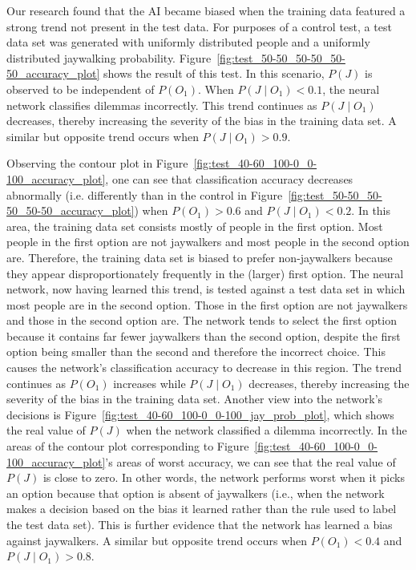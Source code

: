 \documentclass{report}
\begin{document}
Our research found that the AI became biased when the training data featured a strong trend not
present in the test data. For purposes of a control test, a test data set was generated with
uniformly distributed people and a uniformly distributed jaywalking probability.
Figure~\ref{fig:test_50-50_50-50_50-50_accuracy_plot} shows the result of this test. In this
scenario, $P(J)$ is observed to be independent of $P(O_1)$. When $P(J \mid O_1) < 0.1$, the neural
network classifies dilemmas incorrectly. This trend continues as $P(J \mid O_1)$ decreases, thereby
increasing the severity of the bias in the training data set. A similar but opposite trend occurs
when $P(J \mid O_1) > 0.9$.

Observing the contour plot in Figure~\ref{fig:test_40-60_100-0_0-100_accuracy_plot}, one can see
that classification accuracy decreases abnormally (i.e. differently than in the control in
Figure~\ref{fig:test_50-50_50-50_50-50_accuracy_plot}) when $P(O_1) > 0.6$ and $P(J \mid O_1) <
0.2$. In this area, the training data set consists mostly of people in the first option. Most people
in the first option are not jaywalkers and most people in the second option are. Therefore, the
training data set is biased to prefer non-jaywalkers because they appear disproportionately
frequently in the (larger) first option. The neural network, now having learned this trend, is
tested against a test data set in which most people are in the second option. Those in the first
option are not jaywalkers and those in the second option are. The network tends to select the first
option because it contains far fewer jaywalkers than the second option, despite the first option
being smaller than the second and therefore the incorrect choice. This causes the network's
classification accuracy to decrease in this region. The trend continues as $P(O_1)$ increases while
$P(J \mid O_1)$ decreases, thereby increasing the severity of the bias in the training data set.
Another view into the network's decisions is Figure~\ref{fig:test_40-60_100-0_0-100_jay_prob_plot},
which shows the real value of $P(J)$ when the network classified a dilemma incorrectly. In the areas
of the contour plot corresponding to Figure~\ref{fig:test_40-60_100-0_0-100_accuracy_plot}'s areas
of worst accuracy, we can see that the real value of $P(J)$ is close to zero. In other words, the
network performs worst when it picks an option because that option is absent of jaywalkers (i.e.,
when the network makes a decision based on the bias it learned rather than the rule used to label
the test data set). This is further evidence that the network has learned a bias against jaywalkers.
A similar but opposite trend occurs when $P(O_1) < 0.4$ and $P(J \mid O_1) > 0.8$.
\end{document}
